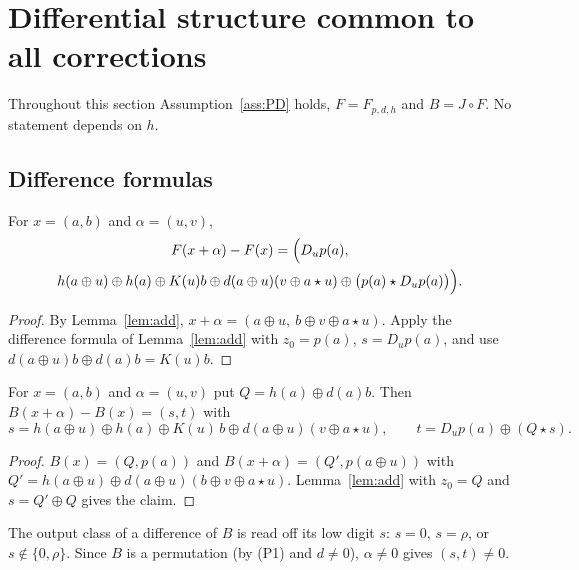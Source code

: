 \section{Differential structure common to all corrections}\label{sec:diff}

Throughout this section Assumption~\ref{ass:PD} holds, $F=F_{p,d,h}$ and $B=J\circ F$.
No statement depends on $h$.

\subsection{Difference formulas}
\begin{lemma}\label{lem:diffF}
For $x=(a,b)$ and $\alpha=(u,v)$,
\begin{multline*}
F(x+\alpha)-F(x)=\Bigl(D_up(a),\\ h(a\oplus u)\oplus h(a)\oplus K(u)b\oplus d(a\oplus u)(v\oplus a\star u)\oplus\bigl(p(a)\star D_up(a)\bigr)\Bigr).
\end{multline*}
\end{lemma}
\begin{proof}
By Lemma~\ref{lem:add}, $x+\alpha=(a\oplus u,\ b\oplus v\oplus a\star u)$. Apply the difference formula
of Lemma~\ref{lem:add} with $z_0=p(a)$, $s=D_up(a)$, and use $d(a\oplus u)b\oplus d(a)b=K(u)b$.
\end{proof}

\begin{lemma}\label{lem:diffB}
For $x=(a,b)$ and $\alpha=(u,v)$ put $Q=h(a)\oplus d(a)b$. Then $B(x+\alpha)-B(x)=(s,t)$ with
\[
s=h(a\oplus u)\oplus h(a)\oplus K(u)\,b\oplus d(a\oplus u)(v\oplus a\star u),\qquad t=D_up(a)\oplus(Q\star s).
\]
\end{lemma}
\begin{proof}
$B(x)=(Q,p(a))$ and $B(x+\alpha)=(Q',p(a\oplus u))$ with
$Q'=h(a\oplus u)\oplus d(a\oplus u)(b\oplus v\oplus a\star u)$. Lemma~\ref{lem:add} with $z_0=Q$ and
$s=Q'\oplus Q$ gives the claim.
\end{proof}

The output class of a difference of $B$ is read off its low digit $s$: $s=0$, $s=\rho$, or
$s\notin\{0,\rho\}$. Since $B$ is a permutation (by (P1) and $d\ne0$), $\alpha\ne0$ gives $(s,t)\ne0$.

